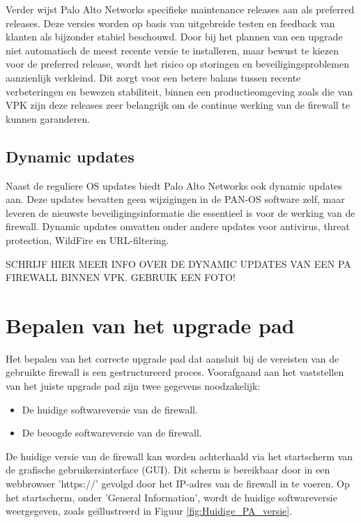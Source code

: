 \vspace{5mm}
Verder wijst Palo Alto Networks specifieke maintenance releases aan als preferred releases. Deze versies worden op basis van uitgebreide testen en feedback van klanten als bijzonder stabiel beschouwd. Door bij het plannen van een upgrade niet automatisch de meest recente versie te installeren, maar bewust te kiezen voor de preferred release, wordt het risico op storingen en beveiligingsproblemen aanzienlijk verkleind. Dit zorgt voor een betere balans tussen recente verbeteringen en bewezen stabiliteit, binnen een productieomgeving zoals die van VPK zijn deze releases zeer belangrijk om de continue werking van de firewall te kunnen garanderen.

\subsection{Dynamic updates}

Naast de reguliere OS updates biedt Palo Alto Networks ook dynamic updates aan. Deze updates bevatten geen wijzigingen in de PAN-OS software zelf, maar leveren de nieuwste beveiligingsinformatie die essentieel is voor de werking van de firewall. Dynamic updates omvatten onder andere updates voor antivirus, threat protection, WildFire en URL-filtering.

\vspace{5mm}

SCHRIJF HIER MEER INFO OVER DE DYNAMIC UPDATES VAN EEN PA FIREWALL BINNEN VPK. GEBRUIK EEN FOTO!




\section{Bepalen van het upgrade pad}
\label{punt:BepalenVanHetUpgradePad}
Het bepalen van het correcte upgrade pad dat aansluit bij de vereisten van de gebruikte firewall is een gestructureerd proces. Voorafgaand aan het vaststellen van het juiste upgrade pad zijn twee gegevens noodzakelijk:  

\begin{itemize}
    \item De huidige softwareversie van de firewall.
    \item De beoogde softwareversie van de firewall.
\end{itemize}

De huidige versie van de firewall kan worden achterhaald via het startscherm van de grafische gebruikersinterface (GUI). Dit scherm is bereikbaar door in een webbrowser 'https://' gevolgd door het IP-adres van de firewall in te voeren. Op het startscherm, onder 'General Information', wordt de huidige softwareversie weergegeven, zoals geïllustreerd in Figuur \ref{fig:Huidige_PA_versie}.

